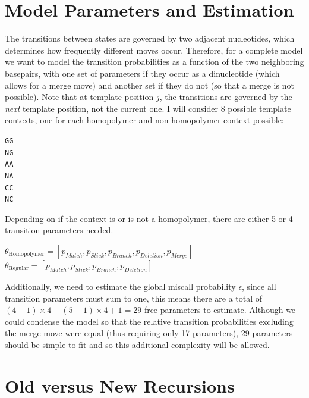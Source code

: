 \documentclass[paper=a4, fontsize=11pt]{scrartcl}
\numberwithin{equation}{section}		%
\numberwithin{figure}{section}			%
\numberwithin{table}{section}				%
\begin{document}
\section{Model Parameters and Estimation}
 
 The transitions between states are governed by two adjacent nucleotides, which determines how frequently different moves occur.  Therefore, for a complete model we want to model the transition probabilities as a function of the two neighboring basepairs, with one set of parameters if they occur as a dinucleotide (which allows for a merge move) and another set if they do not (so that a merge is not possible).  Note that at template position $j$, the transitions are governed by the \textit{next} template position, not the current one.  I will consider 8 possible template contexts, one for each homopolymer and non-homopolymer context possible:
  
 
 \begin{center}
 \texttt{GG \\
NG \\
AA \\
NA \\
CC \\
NC 
 }
 \end{center}
 
 Depending on if the context is or is not a homopolymer, there are either 5 or 4 transition parameters needed.
 
 \begin{center}
$\theta_{\text{Homopolymer}} = [p_{Match}, p_{Stick}, p_{Branch}, p_{Deletion}, p_{Merge} ]$
 \\
$ \theta_{\text{Regular}} = [p_{Match}, p_{Stick}, p_{Branch}, p_{Deletion}]$
\end{center}

Additionally, we need to estimate the global miscall probability $\epsilon$, since all transition parameters must sum to one, this means there are a total of $ (4 -1) \times 4 + (5-1) \times 4 + 1 = 29$ free parameters to estimate.  Although we could condense the model so that the relative transition probabilities excluding the merge move were equal (thus requiring only 17 parameters), 29 parameters should be simple to fit and so this additional complexity will be allowed.  

  
\section{Old versus New Recursions}
\end{document}
